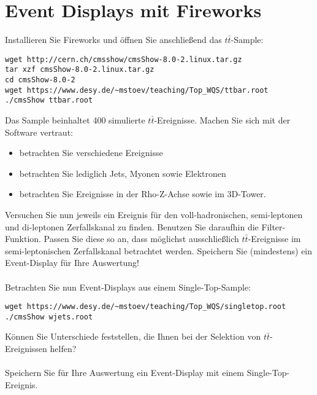 \documentclass[12pt,twoside,a4paper]{article}
\begin{document}
\section*{Event Displays mit Fireworks}
Installieren Sie Fireworks und \"offnen Sie anschlie{\ss}end das $t\bar{t}$-Sample:
\begin{lstlisting}
wget http://cern.ch/cmsshow/cmsShow-8.0-2.linux.tar.gz
tar xzf cmsShow-8.0-2.linux.tar.gz
cd cmsShow-8.0-2
wget https://www.desy.de/~mstoev/teaching/Top_WQS/ttbar.root
./cmsShow ttbar.root
\end{lstlisting}
Das Sample beinhaltet 400 simulierte $t\bar{t}$-Ereignisse. Machen Sie sich mit der Software vertraut:
\begin{itemize}
\item betrachten Sie verschiedene Ereignisse
\item betrachten Sie lediglich Jets, Myonen sowie Elektronen
\item betrachten Sie Ereignisse in der Rho-Z-Achse sowie im 3D-Tower.
\end{itemize}
Versuchen Sie nun jeweils ein Ereignis f\"ur den voll-hadronischen, semi-leptonen und di-leptonen Zerfallskanal zu finden. Benutzen Sie daraufhin die Filter-Funktion. Passen Sie diese so an, dass m\"oglichst ausschlie{\ss}lich $t\bar{t}$-Ereignisse im semi-leptonischen Zerfallskanal betrachtet werden. Speichern Sie (mindestens) ein Event-Display f\"ur Ihre Auswertung!\\
\\
Betrachten Sie nun Event-Displays aus einem Single-Top-Sample:
\begin{lstlisting}
wget https://www.desy.de/~mstoev/teaching/Top_WQS/singletop.root
./cmsShow wjets.root
\end{lstlisting}
K\"onnen Sie Unterschiede feststellen, die Ihnen bei der Selektion von $t\bar{t}$-Ereignissen helfen?\\
\\
Speichern Sie f\"ur Ihre Auswertung ein Event-Display mit einem Single-Top-Ereignis. 

\end{document}
